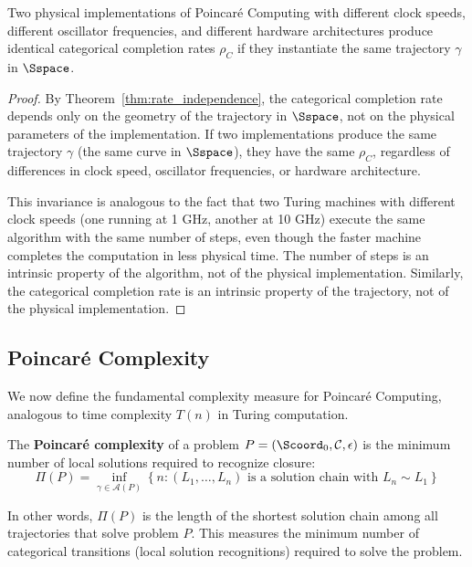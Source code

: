 \begin{corollary}
\label{cor:implementation_invariance}
Two physical implementations of Poincaré Computing with different clock speeds, different oscillator frequencies, and different hardware architectures produce identical categorical completion rates $\rho_C$ if they instantiate the same trajectory $\gamma$ in $\Sspace$.
\end{corollary}

\begin{proof}
By Theorem~\ref{thm:rate_independence}, the categorical completion rate depends only on the geometry of the trajectory in $\Sspace$, not on the physical parameters of the implementation. If two implementations produce the same trajectory $\gamma$ (the same curve in $\Sspace$), they have the same $\rho_C$, regardless of differences in clock speed, oscillator frequencies, or hardware architecture.

This invariance is analogous to the fact that two Turing machines with different clock speeds (one running at 1 GHz, another at 10 GHz) execute the same algorithm with the same number of steps, even though the faster machine completes the computation in less physical time. The number of steps is an intrinsic property of the algorithm, not of the physical implementation. Similarly, the categorical completion rate is an intrinsic property of the trajectory, not of the physical implementation.
\end{proof}

\subsection{Poincaré Complexity}

We now define the fundamental complexity measure for Poincaré Computing, analogous to time complexity $T(n)$ in Turing computation.

\begin{definition}
\label{def:poincare_complexity}
The \textbf{Poincaré complexity} of a problem $P = (\Scoord_0, \mathcal{C}, \epsilon)$ is the minimum number of local solutions required to recognize closure:
\begin{equation}
\Pi(P) = \inf_{\gamma \in \mathcal{A}(P)} \left\{ n : (L_1, \ldots, L_n) \text{ is a solution chain with } L_n \sim L_1 \right\}
\label{eq:poincare_complexity}
\end{equation}

In other words, $\Pi(P)$ is the length of the shortest solution chain among all trajectories that solve problem $P$. This measures the minimum number of categorical transitions (local solution recognitions) required to solve the problem.
\end{definition}

